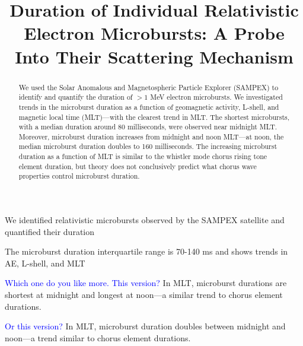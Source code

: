 \documentclass[draft]{agujournal2019}
\begin{document}
%
%



\title{Duration of Individual Relativistic Electron Microbursts: A Probe Into Their Scattering Mechanism}






\begin{keypoints}
\item We identified relativistic microbursts observed by the SAMPEX satellite and quantified their duration
\item The microburst duration interquartile range is 70-140 ms and shows trends in AE, L-shell, and MLT
\item \textcolor{blue}{Which one do you like more. This version?} In MLT, microburst durations are shortest at midnight and longest at noon---a similar trend to chorus element durations.
\item \textcolor{blue}{Or this version?} In MLT, microburst duration doubles between midnight and noon---a trend similar to chorus element durations.
\end{keypoints}

\begin{abstract}
We used the Solar Anomalous and Magnetospheric Particle Explorer (SAMPEX) to identify and quantify the duration of $>1$ MeV electron microbursts. We investigated trends in the microburst duration as a function of geomagnetic activity, L-shell, and magnetic local time (MLT)---with the clearest trend in MLT. The shortest microbursts, with a median duration around 80 milliseconds, were observed near midnight MLT. Moreover, microburst duration increases from midnight and noon MLT---at noon, the median microburst duration doubles to 160 milliseconds. The increasing microburst duration as a function of MLT is similar to the whistler mode chorus rising tone element duration, but theory does not conclusively predict what chorus wave properties control microburst duration.
\end{abstract}
\end{document}
